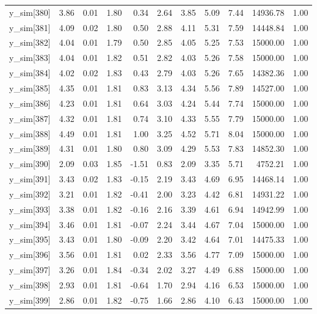 \begin{table}[ht]
\begin{tabular}{rrrrrrrrrrr}
  y\_sim[380] & 3.86 & 0.01 & 1.80 & 0.34 & 2.64 & 3.85 & 5.09 & 7.44 & 14936.78 & 1.00 \\ 
  y\_sim[381] & 4.09 & 0.02 & 1.80 & 0.50 & 2.88 & 4.11 & 5.31 & 7.59 & 14448.84 & 1.00 \\ 
  y\_sim[382] & 4.04 & 0.01 & 1.79 & 0.50 & 2.85 & 4.05 & 5.25 & 7.53 & 15000.00 & 1.00 \\ 
  y\_sim[383] & 4.04 & 0.01 & 1.82 & 0.51 & 2.82 & 4.03 & 5.26 & 7.58 & 15000.00 & 1.00 \\ 
  y\_sim[384] & 4.02 & 0.02 & 1.83 & 0.43 & 2.79 & 4.03 & 5.26 & 7.65 & 14382.36 & 1.00 \\ 
  y\_sim[385] & 4.35 & 0.01 & 1.81 & 0.83 & 3.13 & 4.34 & 5.56 & 7.89 & 14527.00 & 1.00 \\ 
  y\_sim[386] & 4.23 & 0.01 & 1.81 & 0.64 & 3.03 & 4.24 & 5.44 & 7.74 & 15000.00 & 1.00 \\ 
  y\_sim[387] & 4.32 & 0.01 & 1.81 & 0.74 & 3.10 & 4.33 & 5.55 & 7.79 & 15000.00 & 1.00 \\ 
  y\_sim[388] & 4.49 & 0.01 & 1.81 & 1.00 & 3.25 & 4.52 & 5.71 & 8.04 & 15000.00 & 1.00 \\ 
  y\_sim[389] & 4.31 & 0.01 & 1.80 & 0.80 & 3.09 & 4.29 & 5.53 & 7.83 & 14852.30 & 1.00 \\ 
  y\_sim[390] & 2.09 & 0.03 & 1.85 & -1.51 & 0.83 & 2.09 & 3.35 & 5.71 & 4752.21 & 1.00 \\ 
  y\_sim[391] & 3.43 & 0.02 & 1.83 & -0.15 & 2.19 & 3.43 & 4.69 & 6.95 & 14468.14 & 1.00 \\ 
  y\_sim[392] & 3.21 & 0.01 & 1.82 & -0.41 & 2.00 & 3.23 & 4.42 & 6.81 & 14931.22 & 1.00 \\ 
  y\_sim[393] & 3.38 & 0.01 & 1.82 & -0.16 & 2.16 & 3.39 & 4.61 & 6.94 & 14942.99 & 1.00 \\ 
  y\_sim[394] & 3.46 & 0.01 & 1.81 & -0.07 & 2.24 & 3.44 & 4.67 & 7.04 & 15000.00 & 1.00 \\ 
  y\_sim[395] & 3.43 & 0.01 & 1.80 & -0.09 & 2.20 & 3.42 & 4.64 & 7.01 & 14475.33 & 1.00 \\ 
  y\_sim[396] & 3.56 & 0.01 & 1.81 & 0.02 & 2.33 & 3.56 & 4.77 & 7.09 & 15000.00 & 1.00 \\ 
  y\_sim[397] & 3.26 & 0.01 & 1.84 & -0.34 & 2.02 & 3.27 & 4.49 & 6.88 & 15000.00 & 1.00 \\ 
  y\_sim[398] & 2.93 & 0.01 & 1.81 & -0.64 & 1.70 & 2.94 & 4.16 & 6.53 & 15000.00 & 1.00 \\ 
  y\_sim[399] & 2.86 & 0.01 & 1.82 & -0.75 & 1.66 & 2.86 & 4.10 & 6.43 & 15000.00 & 1.00 \\ 

\end{tabular}
\end{table}
